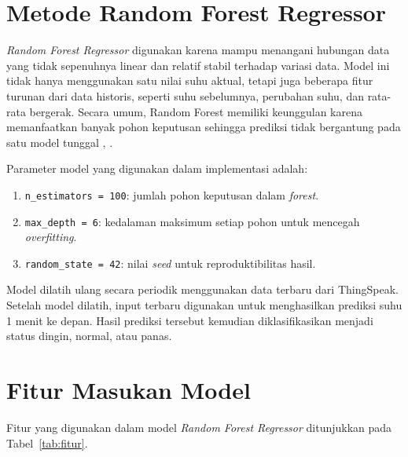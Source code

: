 \section{Metode Random Forest Regressor}

\textit{Random Forest Regressor} digunakan karena mampu menangani hubungan
data yang tidak sepenuhnya linear dan relatif stabil terhadap variasi data.
Model ini tidak hanya menggunakan satu nilai suhu aktual, tetapi juga
beberapa fitur turunan dari data historis, seperti suhu sebelumnya, perubahan
suhu, dan rata-rata bergerak. Secara umum, Random Forest memiliki keunggulan
karena memanfaatkan banyak pohon keputusan sehingga prediksi tidak bergantung
pada satu model tunggal \cite{breiman2001}, \cite{sklearn_rf}.

Parameter model yang digunakan dalam implementasi adalah:

\begin{enumerate}
    \item \texttt{n\_estimators = 100}: jumlah pohon keputusan dalam
    \textit{forest}.
    \item \texttt{max\_depth = 6}: kedalaman maksimum setiap pohon untuk
    mencegah \textit{overfitting}.
    \item \texttt{random\_state = 42}: nilai \textit{seed} untuk
    reproduktibilitas hasil.
\end{enumerate}

Model dilatih ulang secara periodik menggunakan data terbaru dari ThingSpeak.
Setelah model dilatih, input terbaru digunakan untuk menghasilkan prediksi
suhu 1 menit ke depan. Hasil prediksi tersebut kemudian diklasifikasikan
menjadi status dingin, normal, atau panas.

\section{Fitur Masukan Model}

Fitur yang digunakan dalam model \textit{Random Forest Regressor} ditunjukkan
pada Tabel~\ref{tab:fitur}.

